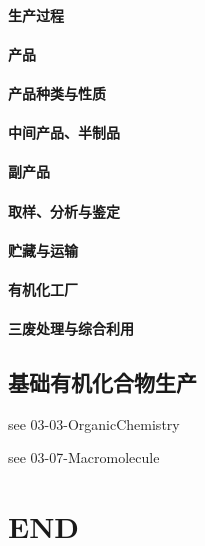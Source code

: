 \documentclass[UTF8]{../../ApplicationUniverse}
\begin{document}
    \subsubsection{生产过程}
    \subsubsection{产品}
        \subsubsection{产品种类与性质}
        \subsubsection{中间产品、半制品}
        \subsubsection{副产品}
        \subsubsection{取样、分析与鉴定}
        \subsubsection{贮藏与运输}
    \subsubsection{有机化工厂}
    \subsubsection{三废处理与综合利用}


\section{基础有机化合物生产}%
see 03-03-OrganicChemistry

see 03-07-Macromolecule


\chapter{END}
\end{document}
